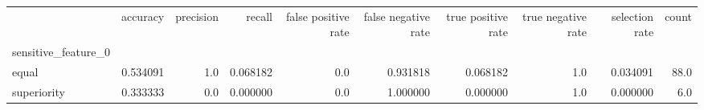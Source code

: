 \begin{tabular}{lrrrrrrrrr}
\toprule
{} &  accuracy &  precision &    recall &  false positive rate &  false negative rate &  true positive rate &  true negative rate &  selection rate &  count \\
sensitive\_feature\_0 &           &            &           &                      &                      &                     &                     &                 &        \\
\midrule
equal               &  0.534091 &        1.0 &  0.068182 &                  0.0 &             0.931818 &            0.068182 &                 1.0 &        0.034091 &   88.0 \\
superiority         &  0.333333 &        0.0 &  0.000000 &                  0.0 &             1.000000 &            0.000000 &                 1.0 &        0.000000 &    6.0 \\
\bottomrule
\end{tabular}
